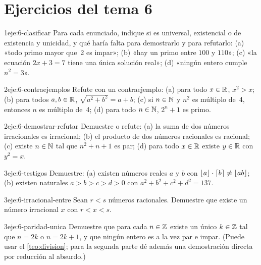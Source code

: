 \section*{Ejercicios del tema 6}

\begin{ejercicio}{1}{eje:6-clasificar}
Para cada enunciado, indique si es universal, existencial o de existencia y unicidad, y qué haría falta para demostrarlo y para refutarlo: (a) «todo primo mayor que~2 es impar»; (b) «hay un primo entre $100$ y $110$»; (c) «la ecuación $2x+3=7$ tiene una única solución real»; (d) «ningún entero cumple $n^{2}=3$».
\end{ejercicio}

\begin{ejercicio}{2}{eje:6-contraejemplos}
Refute con un contraejemplo: (a) para todo $x\in\mathbb{R}$, $x^{2}>x$; (b) para todos $a,b\in\mathbb{R}$, $\sqrt{a^{2}+b^{2}}=a+b$; (c) si $n\in\mathbb{N}$ y $n^{2}$ es múltiplo de~4, entonces $n$ es múltiplo de~4; (d) para todo $n\in\mathbb{N}$, $2^{n}+1$ es primo.
\end{ejercicio}

\begin{ejercicio}{2}{eje:6-demostrar-refutar}
Demuestre o refute: (a) la suma de dos números irracionales es irracional; (b) el producto de dos números racionales es racional; (c) existe $n\in\mathbb{N}$ tal que $n^{2}+n+1$ es par; (d) para todo $x\in\mathbb{R}$ existe $y\in\mathbb{R}$ con $y^{2}=x$.
\end{ejercicio}

\begin{ejercicio}{3}{eje:6-testigos}
Demuestre: (a) existen números reales $a$ y $b$ con $\lfloor a\rfloor\cdot\lceil b\rceil\neq\lfloor ab\rfloor$; (b) existen naturales $a>b>c>d>0$ con $a^{2}+b^{2}+c^{2}+d^{2}=137$.
\end{ejercicio}

\begin{ejercicio}{3}{eje:6-irracional-entre}
Sean $r<s$ números racionales. Demuestre que existe un número irracional $x$ con $r<x<s$.
\end{ejercicio}

\begin{ejercicio}{3}{eje:6-paridad-unica}
Demuestre que para cada $n\in\mathbb{Z}$ existe un único $k\in\mathbb{Z}$ tal que $n=2k$ o $n=2k+1$, y que ningún entero es a la vez par e impar. (Puede usar el \cref{teo:division}; para la segunda parte dé además una demostración directa por reducción al absurdo.)
\end{ejercicio}

